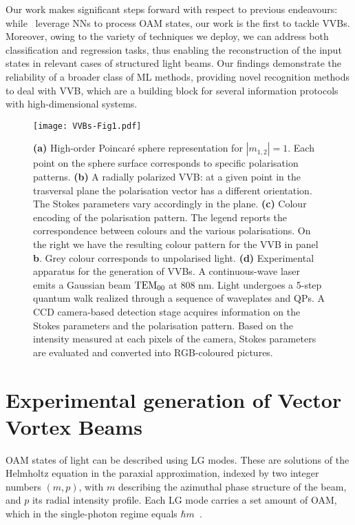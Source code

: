 Our work makes significant steps forward with respect to previous endeavours: while~\cite{krenn2014communication,krenn2016twisted,doster2017machine, park2018demultiplexing, lohani2018turbulence, li2018joint} leverage \acp{NN} to process \ac{OAM} states, our work is the first to tackle \acp{VVB}. Moreover, owing to the variety of techniques we deploy, we can address both classification and regression tasks, thus enabling the reconstruction of the input states in relevant cases of structured light beams.
Our findings demonstrate the reliability of a broader class of ML methods, providing novel recognition methods to deal with \ac{VVB}, which are a building block for several information protocols with high-dimensional systems.


\begin{figure}[tb]
	\centering
   \texttt{[image: VVBs-Fig1.pdf]}
    \caption{
    	\textbf{(a)} High-order Poincar\'e sphere representation for $|m_{1,2}|=1$. Each point on the sphere surface corresponds to specific polarisation patterns. 
	    \textbf{(b)} A radially polarized \ac{VVB}: at a given point in the trasversal plane the polarisation vector has a different orientation. The Stokes parameters vary accordingly in the plane.
	    \textbf{(c)} Colour encoding of the polarisation pattern. 
	    The legend reports the correspondence between colours and the various polarisations.
	    On the right we have the resulting colour pattern for the VVB in panel {\bf b}.
	    Grey colour corresponds to unpolarised light.
	    \textbf{(d)} Experimental apparatus for the generation of \acp{VVB}. A continuous-wave laser emits a Gaussian beam ${\rm TEM}_{00}$ at $808$ nm. Light undergoes a 5-step quantum walk realized through a sequence of waveplates and QPs.
    	A CCD camera-based detection stage acquires information on the Stokes parameters and the polarisation pattern. Based on the intensity measured at each pixels of the  camera, Stokes parameters are evaluated and converted into RGB-coloured pictures.
    }%
    \label{fig:VVBs:poinc_sphere}
\end{figure}


\section{Experimental generation of Vector Vortex Beams}

\acf{OAM} states of light can be described using \ac{LG} modes.
These are solutions of the Helmholtz equation in the paraxial approximation, indexed by two integer numbers $(m, p)$, with $m$ describing the azimuthal phase structure of the beam, and $p$ its radial intensity profile.
Each \ac{LG} mode carries a set amount of \ac{OAM}, which in the single-photon regime equals $\hbar m$~\cite{allen1992orbital}.

